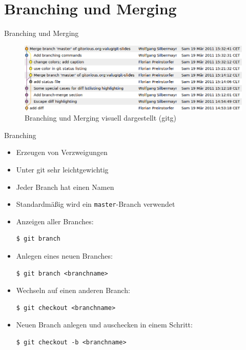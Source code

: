 \section{Branching und Merging}

\begin{frame}
  \tableofcontents[currentsection]
\end{frame}

\begin{frame}{Branching und Merging}
  \begin{figure}
    \includegraphics[width=1\textwidth]{img/branch-merge}
    \caption[format=empty]{Branching und Merging visuell dargestellt (gitg)}
  \end{figure}
\end{frame}

\begin{frame}{Branching}
  \begin{itemize}
    \item Erzeugen von Verzweigungen
    \item Unter git sehr leichtgewichtig
    \item Jeder Branch hat einen Namen
    \item Standardmäßig wird ein \texttt{master}-Branch verwendet
    \framebreak

    \item Anzeigen aller Branches:
    \begin{lstlisting}
$ git branch
    \end{lstlisting}
    \item Anlegen eines neuen Branches:
    \begin{lstlisting}
$ git branch <branchname>
    \end{lstlisting}
    \item Wechseln auf einen anderen Branch:
    \begin{lstlisting}
$ git checkout <branchname>
    \end{lstlisting}
    \item Neuen Branch anlegen und auschecken in einem Schritt:
    \begin{lstlisting}
$ git checkout -b <branchname>
    \end{lstlisting}

  \end{itemize}

\end{frame}

